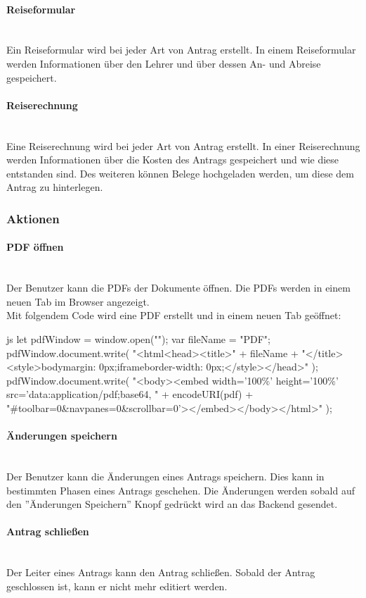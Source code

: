 \paragraph{Reiseformular}~\\
Ein Reiseformular wird bei jeder Art von Antrag erstellt. In einem Reiseformular werden Informationen über den Lehrer und über dessen An- und Abreise gespeichert.
\paragraph{Reiserechnung}~\\
Eine Reiserechnung wird bei jeder Art von Antrag erstellt. In einer Reiserechnung werden Informationen über die Kosten des Antrags gespeichert und wie diese entstanden sind. Des weiteren können Belege hochgeladen werden, um diese dem Antrag zu hinterlegen.
\subsubsection{Aktionen}
\paragraph{PDF öffnen}~\\
Der Benutzer kann die PDFs der Dokumente öffnen. Die PDFs werden in einem neuen Tab im Browser angezeigt.\\
Mit folgendem Code wird eine PDF erstellt und in einem neuen Tab geöffnet:\cite{sof_pdf}
\begin{code}{js}
	let pdfWindow = window.open("");
	var fileName = "PDF";
	pdfWindow.document.write(
	"<html<head><title>" +
	fileName +
	"</title><style>body{margin: 0px;}iframe{border-width: 0px;}</style></head>"
	);
	pdfWindow.document.write(
	"<body><embed width='100\%' height='100\%' src='data:application/pdf;base64, " +
	encodeURI(pdf) +
	"#toolbar=0\&navpanes=0\&scrollbar=0'></embed></body></html>"
	);
\end{code}
\paragraph{Änderungen speichern}~\\
Der Benutzer kann die Änderungen eines Antrags speichern. Dies kann in bestimmten Phasen eines Antrags geschehen. Die Änderungen werden sobald auf den ''Änderungen Speichern'' Knopf gedrückt wird an das Backend gesendet.
\paragraph{Antrag schließen}~\\
Der Leiter eines Antrags kann den Antrag schließen. Sobald der Antrag geschlossen ist, kann er nicht mehr editiert werden.
\newpage
